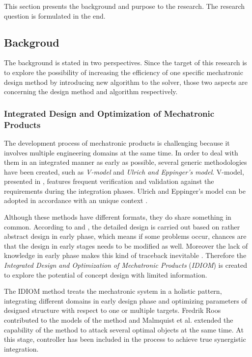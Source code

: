 This section presents the background and purpose to the research. The research question is formulated in the end.

\subsection{Backgroud}
The background is stated in two perspectives. Since the target of this research is to explore the possibility of increasing the efficiency of one specific mechatronic design method by introducing new algorithm to the solver, those two aspects are concerning the design method and algorithm respectively.

\subsubsection{Integrated Design and Optimization of Mechatronic Products}
The development process of mechatronic products is challenging because it involves multiple engineering domains at the same time. In order to deal with them in an integrated manner as early as possible, several generic methodologies have been created, such as \textit{V-model} and \textit{Ulrich and Eppinger's model}. V-model, presented in \cite{VDI}, features frequent verification and validation against the requirements during the integration phases. Ulrich and Eppinger's model can be adopted in accordance with an unique context \cite{Ulrich}.

Although these methods have different formats, they do share something in common. According to \cite{VDI} and \cite{Ulrich}, the detailed design is carried out based on rather abstract design in early phase, which means if some problems occur, chances are that the design in early stages needs to be modified as well. Moreover the lack of knowledge in early phase makes this kind of traceback inevitable \cite{Holistic}. Therefore the \textit{Integrated Design and Optimization of Mechatronic Products} (\textit{IDIOM}) is created to explore the potential of concept design with limited information.

The IDIOM method treats the mechatronic system in a holistic pattern,  integrating different domains in early design phase and optimizing parameters of designed structure with respect to one or multiple targets. Fredrik Roos contributed to the models of the method \cite{Roos} and Malmquist et al. extended the capability of the method to attack several optimal objects at the same time. At this stage, controller has been included in the process to achieve true synergistic integration.

